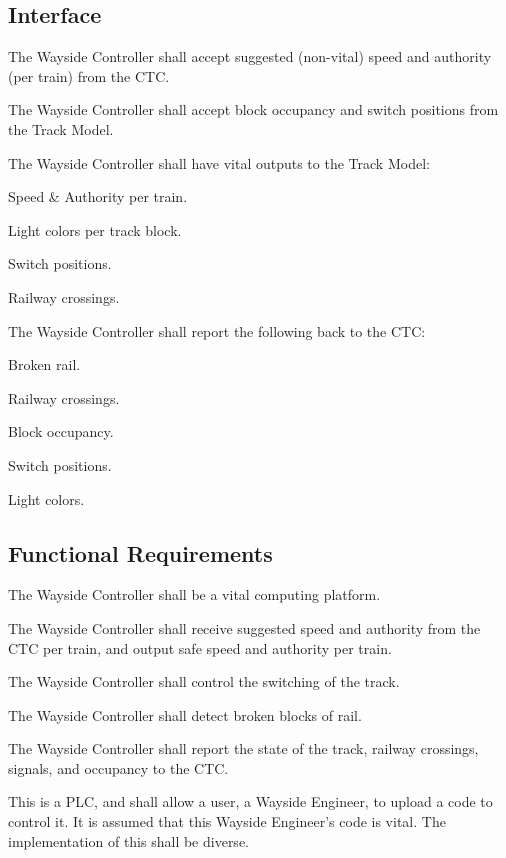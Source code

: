 \documentclass{scrreprt}
\begin{document}
\subsection{Interface}
\begin{numonly}
    \item The Wayside Controller shall accept suggested (non-vital) speed and authority (per train) from the CTC.
    \item The Wayside Controller shall accept block occupancy and switch positions from the Track Model.
    \item The Wayside Controller shall have vital outputs to the Track Model:
    \begin{numonly}
        \item Speed \& Authority per train.
        \item Light colors per track block.
        \item Switch positions.
        \item Railway crossings.
    \end{numonly}
    \item The Wayside Controller shall report the following back to the CTC:
    \begin{numonly}
        \item Broken rail.
        \item Railway crossings.
        \item Block occupancy.
        \item Switch positions.
        \item Light colors.
    \end{numonly}
\end{numonly}

\subsection{Functional Requirements}
\begin{numonly}
    \item The Wayside Controller shall be a vital computing platform.
    \item The Wayside Controller shall receive suggested speed and authority from the CTC per train, and output safe speed and authority per train.
    \item The Wayside Controller shall control the switching of the track.
    \item The Wayside Controller shall detect broken blocks of rail.
    \item The Wayside Controller shall report the state of the track, railway crossings, signals, and occupancy to the CTC.
    \item This is a PLC, and shall allow a user, a Wayside Engineer, to upload a code to control it. It is assumed that this Wayside Engineer's code is vital. The implementation of this shall be diverse.
\end{numonly}
\end{document}
